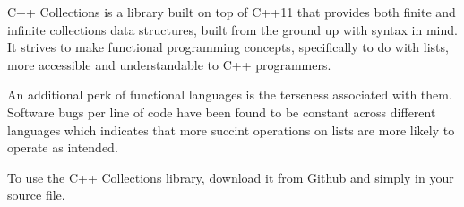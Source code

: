 C++ Collections is a library built on top of C++11 that provides both finite and infinite collections data structures, built from the ground up with syntax in mind.
It strives to make functional programming concepts, specifically to do with lists, more accessible and understandable to C++ programmers.

An additional perk of functional languages is the terseness associated with them.
Software bugs per line of code have been found to be constant across different languages\cite{code_complete} which indicates that more succint operations on lists are more likely to operate as intended.

To use the C++ Collections library, download it from Github and simply  in your source file.

